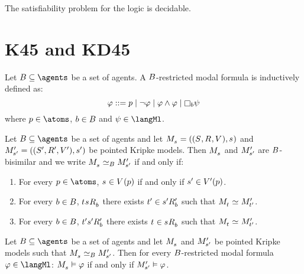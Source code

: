 \begin{corollary}
The satisfiability problem for the logic \logicRmlK{} is decidable.
\end{corollary}

\section{K45 and KD45}

\begin{definition}
Let $\agentsB \subseteq \agents$ be a set of agents.
A $B$-restricted modal formula is inductively defined as:
$$
\phi ::= \atomP \mid
         \lnot \phi \mid
         \phi \land \phi \mid
         \necessary[\agentB] \psi
$$
where $\atomP \in \atoms$, $b \in B$ and $\psi \in \langMl$.
\end{definition}

\begin{definition}
Let $\agentsB \subseteq \agents$ be a set of agents and let $\kPModelAndTuple{\kStateS}$ and $\kPModelAndTupleP{\kStateSP}$ be pointed Kripke models.
Then $\kPModel{\kStateS}$ and ${M^{\prime}_{{s}^{\prime}}}$ are $B$-bisimilar and we write $\kPModel{\kStateS} \bisimilar[\agentsB] \kPModelP{\kStateSP}$ if and only if:
\begin{enumerate}
    \item For every $\atomP \in \atoms$, $\kStateS \in \kValuation(\atomP)$ if and only if ${s}^{\prime} \in {V^{\prime}}(p)$.
    \item For every $b \in B$, $\kStateT \kSuccessorsB{\kStateS}$ there exists ${t}^{\prime} \in {{s}^{\prime}} {R^{\prime}_{b}}$ such that $\kPModel{\kStateT} \bisimilar \kPModelP{\kStateTP}$.
    \item For every $b \in B$, ${t}^{\prime} {{s}^{\prime}} {R^{\prime}_{b}}$ there exists $\kStateT \in \kSuccessorsB{\kStateS}$ such that $\kPModel{\kStateT} \bisimilar \kPModelP{\kStateTP}$.
\end{enumerate}

\end{definition}

\begin{lemma}\label{b-restricted-invariance}
Let $\agentsB \subseteq \agents$ be a set of agents and let $\kPModel{\kStateS}$ and ${M^{\prime}_{{s}^{\prime}}}$ be pointed Kripke models such that $\kPModel{\kStateS} \bisimilar[\agentsB] \kPModelP{\kStateSP}$.
Then for every $B$-restricted modal formula $\phi \in \langMl$:
$\kPModel{\kStateS} \entails \phi$ if and only if ${M^{\prime}_{{s}^{\prime}}} \vDash \varphi$.
\end{lemma}

